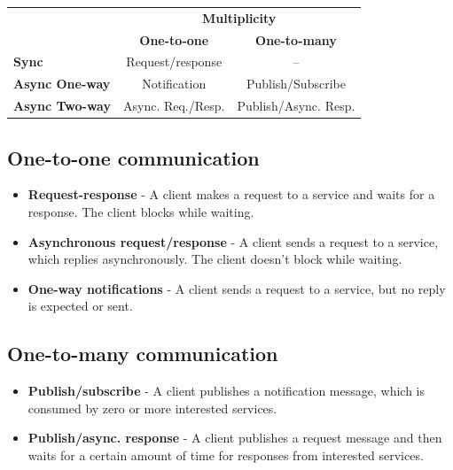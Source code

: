 \begin{table}[h!]
  \renewcommand{\arraystretch}{1.4}
  \centering
  \begin{tabular}{l c c}
    \toprule
                           & \multicolumn{2}{c}{\textbf{Multiplicity}}                        \\
                           & \textbf{One-to-one}                       & \textbf{One-to-many} \\
    \midrule
    \textbf{Sync}          & Request/response                          & --                   \\
    \textbf{Async One-way} & Notification                              & Publish/Subscribe    \\
    \textbf{Async Two-way} & Async. Req./Resp.                         & Publish/Async. Resp. \\
    \bottomrule
  \end{tabular}
\end{table}


\subsection{One-to-one communication}

\begin{itemize}

  \item \textbf{Request-response} - A client makes a request to a service and waits
        for a response. The client blocks while waiting.

  \item \textbf{Asynchronous request/response} - A client sends a request to a
        service, which replies asynchronously. The client doesn't block while waiting.

  \item \textbf{One-way notifications} - A client sends a request to a service, but no
        reply is expected or sent.

\end{itemize}

\subsection{One-to-many communication}

\begin{itemize}

  \item \textbf{Publish/subscribe} - A client publishes a notification message, which
        is consumed by zero or more interested services.

  \item \textbf{Publish/async. response} - A client publishes a request message and
        then waits for a certain amount of time for responses from interested services.

\end{itemize}

